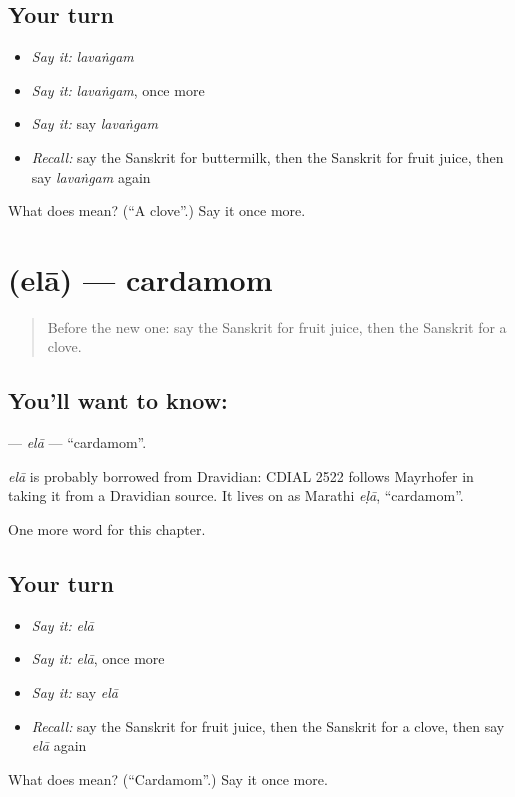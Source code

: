 \subsection*{Your turn}
\begin{itemize}
\raggedright
  \item \emph{Say it:} \emph{lavaṅgam}
  \item \emph{Say it:} \emph{lavaṅgam}, once more
  \item \emph{Say it:} say \emph{lavaṅgam}
  \item \emph{Recall:} say the Sanskrit for buttermilk, then the Sanskrit for fruit juice, then say \emph{lavaṅgam} again
\end{itemize}

\begin{tcolorbox}[breakable,colback=teal!4,colframe=teal!35!black,title={Before you move on}]
What does  mean? (\textquotedblleft{}A clove\textquotedblright{}.) Say it once more.
\end{tcolorbox}
\section[\texorpdfstring{\sk{एला} (elā)}{एला (elā)}]{ (elā) — cardamom}

\label{lesson:SA-C245-ela}



\begin{quote}
Before the new one: say the Sanskrit for fruit juice, then the Sanskrit for a clove.
\end{quote}

\subsection*{You'll want to know: }
\textbf{} — \emph{elā} — \textquotedblleft{}cardamom\textquotedblright{}.

\begin{cousinweb}
\emph{elā} is probably borrowed from Dravidian: CDIAL 2522 follows Mayrhofer in taking it from a Dravidian source. It lives on as Marathi \emph{eḷā}, \textquotedblleft{}cardamom\textquotedblright{}.
\end{cousinweb}

\begin{grammarlens}[title={What you've built}]
One more word for this chapter.
\end{grammarlens}

\subsection*{Your turn}
\begin{itemize}
\raggedright
  \item \emph{Say it:} \emph{elā}
  \item \emph{Say it:} \emph{elā}, once more
  \item \emph{Say it:} say \emph{elā}
  \item \emph{Recall:} say the Sanskrit for fruit juice, then the Sanskrit for a clove, then say \emph{elā} again
\end{itemize}

\begin{tcolorbox}[breakable,colback=teal!4,colframe=teal!35!black,title={Before you move on}]
What does  mean? (\textquotedblleft{}Cardamom\textquotedblright{}.) Say it once more.
\end{tcolorbox}
